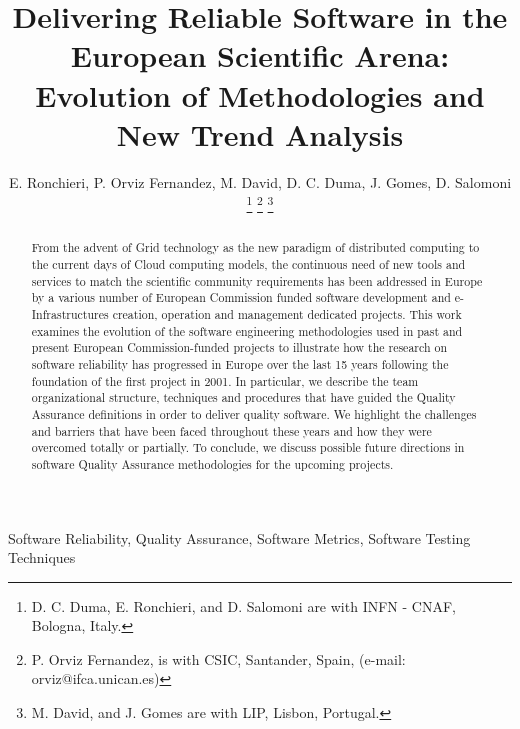 \documentclass[journal]{IEEEtran}
\begin{document}
\title{Delivering Reliable Software in the European Scientific Arena: Evolution of Methodologies and New Trend Analysis}

\author{E. Ronchieri,
        P. Orviz Fernandez,
        M. David,
	D. C. Duma,
        J. Gomes,
        D. Salomoni
\thanks{D. C. Duma, E. Ronchieri, and D. Salomoni are with INFN - CNAF, Bologna, Italy.}
\thanks{P. Orviz Fernandez, is with CSIC, Santander, Spain, (e-mail: orviz@ifca.unican.es)}
\thanks{M. David, and J. Gomes are with LIP, Lisbon, Portugal.}%
}


\maketitle

\begin{abstract}
From the advent of Grid technology as the new paradigm of distributed
computing to the current days of Cloud computing models, the continuous need
of new tools and services to match the scientific community requirements has been
addressed in Europe by a various number of European Commission funded software development
and e-Infrastructures creation, operation and management dedicated projects.
This work examines the evolution of the software engineering methodologies used in past and present
European Commission-funded projects to illustrate how the research on software
reliability has progressed in Europe over the last 15 years following the
foundation of the first project in 2001. In particular, we describe the team
organizational structure, %
 techniques and procedures that have guided the Quality
Assurance definitions in order to deliver quality software. We highlight the challenges
and barriers that have been faced throughout these years and how they were overcomed totally or
partially. To conclude, we discuss possible future directions in software
Quality Assurance methodologies for the upcoming projects.
\end{abstract}

\begin{IEEEkeywords}
Software Reliability, Quality Assurance, Software Metrics, Software Testing
Techniques
\end{IEEEkeywords}
\end{document}
